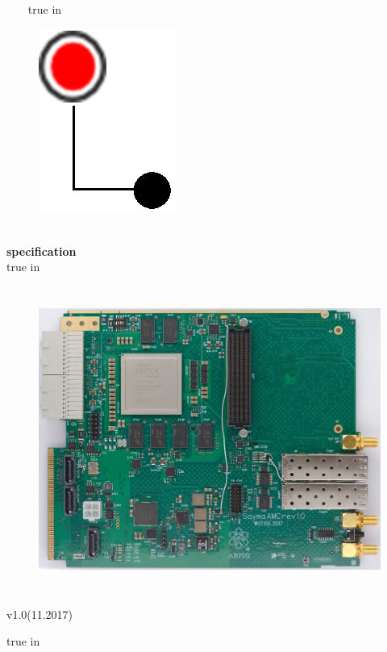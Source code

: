 \begin{titlepage}




\textcolor{white}{xxx} 
 true in

\begin{figure}
	\begin{center}
		\vspace{-35pt}
		\includegraphics[scale=0.5]{img/kropki.eps}
	\end{center}
\end{figure}

\textbf{{\LARGE \nazwa}} \\
\linebreak
\textbf{ {\indent \indent \LARGE specification}}\\
 true in

\begin{figure}[htbp!]
	\centering
	\includegraphics[height=10cm]{img/SaymaT.jpg}\\
\end{figure}
\begin{center}
	v1.0(11.2017)
\end{center}

 true in





\end{titlepage}
